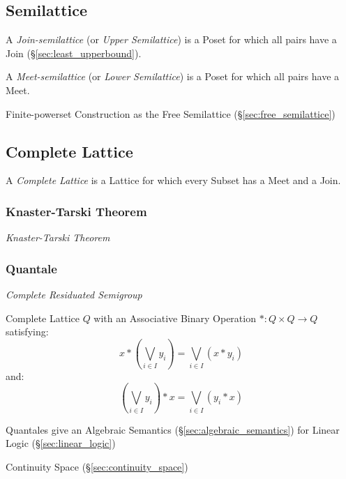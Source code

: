 \subsection{Semilattice}\label{sec:semilattice}

A \emph{Join-semilattice} (or \emph{Upper Semilattice}) is a Poset for
which all pairs have a Join (\S\ref{sec:least_upperbound}).

A \emph{Meet-semilattice} (or \emph{Lower Semilattice}) is a Poset for
which all pairs have a Meet.

Finite-powerset Construction as the Free Semilattice
(\S\ref{sec:free_semilattice})



\subsection{Complete Lattice}\label{sec:complete_lattice}

A \emph{Complete Lattice} is a Lattice for which every Subset has a
Meet and a Join.



\subsubsection{Knaster-Tarski Theorem}\label{sec:knaster_tarski}

\emph{Knaster-Tarski Theorem}



\subsubsection{Quantale}\label{sec:quantale}

\emph{Complete Residuated Semigroup}

Complete Lattice $Q$ with an Associative Binary Operation $* : Q
\times Q \rightarrow Q$ satisfying:
\[
  x*(\bigvee_{i \in I} y_i) = \bigvee_{i \in I}(x * y_i)
\]
and:
\[
  (\bigvee_{i \in I} y_i)*x = \bigvee_{i \in I}(y_i * x)
\]

Quantales give an Algebraic Semantics
(\S\ref{sec:algebraic_semantics}) for Linear Logic
(\S\ref{sec:linear_logic})

Continuity Space (\S\ref{sec:continuity_space})



